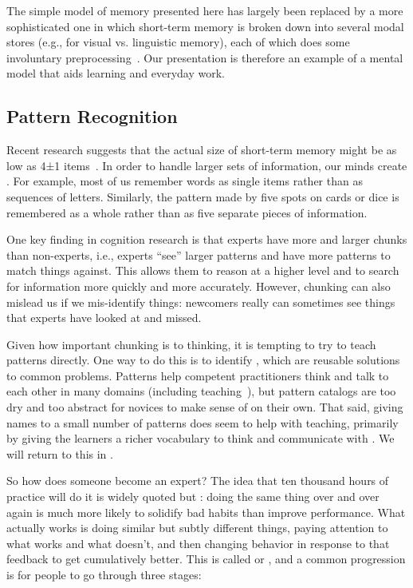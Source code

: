 The simple model of memory presented here has largely been replaced by a more sophisticated one
in which short-term memory is broken down into several modal stores
(e.g., for visual vs. linguistic memory),
each of which does some involuntary preprocessing~\cite{Mill2016a}.
Our presentation is therefore an example of a mental model that aids learning and everyday work.

\subsection*{Pattern Recognition}

Recent research suggests that the actual size of short-term memory
might be as low as 4±1 items~\cite{Dida2016}.
In order to handle larger sets of information,
our minds create .
For example,
most of us remember words as single items rather than as sequences of letters.
Similarly,
the pattern made by five spots on cards or dice is remembered as a whole
rather than as five separate pieces of information.

One key finding in cognition research is that
experts have more and larger chunks than non-experts,
i.e., experts ``see'' larger patterns and have more patterns to match things against.
This allows them to reason at a higher level
and to search for information more quickly and more accurately.
However,
chunking can also mislead us if we mis-identify things:
newcomers really can sometimes see things that experts have looked at and missed.

Given how important chunking is to thinking,
it is tempting to try to teach patterns directly.
One way to do this is to identify ,
which are reusable solutions to common problems.
Patterns help competent practitioners think and talk to each other in many domains (including teaching~\cite{Berg2012}),
but pattern catalogs are too dry and too abstract for novices to make sense of on their own.
That said,
giving names to a small number of patterns does seem to help with teaching,
primarily by giving the learners a richer vocabulary to think and communicate with \cite{Kuit2004,Byck2005,Saja2006}.
We will return to this in .


So how does someone become an expert?
The idea that ten thousand hours of practice will do it is widely quoted
but :
doing the same thing over and over again is much more likely to solidify bad habits than improve performance.
What actually works is doing similar but subtly different things,
paying attention to what works and what doesn't,
and then changing behavior in response to that feedback to get cumulatively better.
This is called 
or ,
and a common progression is for people to go through three stages:

